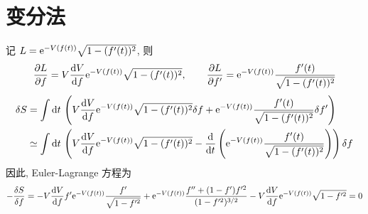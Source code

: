 \chapter{变分法}
\begin{solution}
    记 $L = \mathrm e^{-V(f(t))} \sqrt{1-(f'(t))^2}$, 则
    \[
        \frac{\partial L}{\partial f} = V \frac{\dd V}{\dd f} \mathrm e^{-V(f(t))} \sqrt{1-(f'(t))^2}, \qquad 
        \frac{\partial L}{\partial f'} = \mathrm e^{-V(f(t))} \frac{f'(t)}{\sqrt{1-(f'(t))^2}}
    \]
    \[
    \begin{aligned}
        \delta S &= \int \dd t\,\left(V \frac{\dd V}{\dd f} \mathrm e^{-V(f(t))} \sqrt{1-(f'(t))^2} \delta f + \mathrm e^{-V(f(t))} \frac{f'(t)}{\sqrt{1-(f'(t))^2}} \delta f'\right)\\
        &\simeq \int \dd t\,\left(V \frac{\dd V}{\dd f} \mathrm e^{-V(f(t))} \sqrt{1-(f'(t))^2} - \frac{\dd}{\dd t}\left(\mathrm e^{-V(f(t))} \frac{f'(t)}{\sqrt{1-(f'(t))^2}}\right)\right) \delta f
    \end{aligned}
    \]
    因此, Euler-Lagrange 方程为
    \[
        - \frac{\delta S}{\delta f} = - V \frac{\dd V}{\dd f} f' \mathrm e^{-V(f(t))} \frac{f'}{\sqrt{1-f'^2}} + \mathrm e^{-V(f(t))} \frac{f'' + (1-f')f'^2}{(1 - f'^2)^{3/2}} - V \frac{\dd V}{\dd f} \mathrm e^{- V(f(t))} \sqrt{1-f'^2} = 0
    \]
\end{solution}

